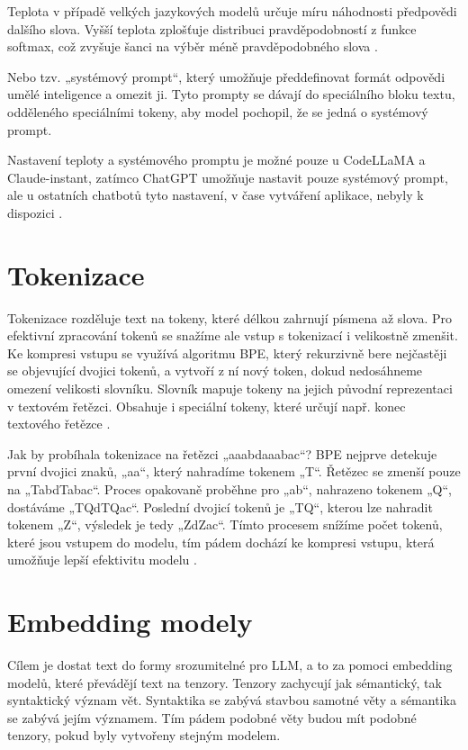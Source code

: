 \documentclass[FM,DP]{tulthesis}
\begin{document}
		Teplota v případě velkých jazykových modelů určuje míru náhodnosti předpovědi dalšího slova. Vyšší teplota zplošťuje distribuci pravděpodobností z funkce softmax, což zvyšuje šanci na výběr méně pravděpodobného slova \cite{llm_parameters}.
		
		Nebo tzv. „systémový prompt“, který umožňuje předdefinovat formát odpovědi umělé inteligence a omezit ji. Tyto prompty se dávají do speciálního bloku textu, odděleného speciálními tokeny, aby model pochopil, že se jedná o systémový prompt. 
		
		Nastavení teploty a systémového promptu je možné pouze u CodeLLaMA a Claude-instant, zatímco ChatGPT umožňuje nastavit pouze systémový prompt, ale u ostatních chatbotů tyto nastavení, v čase vytváření aplikace, nebyly k dispozici \cite{llm_parameters}.
		
		\section{Tokenizace}
		Tokenizace rozděluje text na tokeny, které délkou zahrnují písmena až slova. Pro efektivní zpracování tokenů se snažíme ale vstup s tokenizací i velikostně zmenšit. Ke kompresi vstupu se využívá algoritmu BPE, který rekurzivně bere nejčastěji se objevující dvojici tokenů, a vytvoří z ní nový token, dokud nedosáhneme omezení velikosti slovníku. Slovník mapuje tokeny na jejich původní reprezentaci v textovém řetězci. Obsahuje i speciální tokeny, které určují např. konec textového řetězce \cite{rothman2021transformers}. 
		
		Jak by probíhala tokenizace na řetězci „aaabdaaabac“? BPE nejprve detekuje první dvojici znaků, „aa“, který nahradíme tokenem „T“. Řetězec se zmenší pouze na „TabdTabac“. Proces opakovaně proběhne pro „ab“, nahrazeno tokenem „Q“, dostáváme „TQdTQac“. Poslední dvojicí tokenů je „TQ“, kterou lze nahradit tokenem „Z“, výsledek je tedy „ZdZac“. Tímto procesem snížíme počet tokenů, které jsou vstupem do modelu, tím pádem dochází ke kompresi vstupu, která umožňuje lepší efektivitu modelu \cite{rothman2021transformers}.
		
		\section{Embedding modely}
		Cílem je dostat text do formy srozumitelné pro LLM, a to za pomoci embedding modelů, které převádějí text na tenzory. Tenzory zachycují jak sémantický, tak syntaktický význam vět. Syntaktika se zabývá stavbou samotné věty a sémantika se zabývá jejím významem. Tím pádem podobné věty budou mít podobné tenzory, pokud byly vytvořeny stejným modelem.
		
\end{document}
